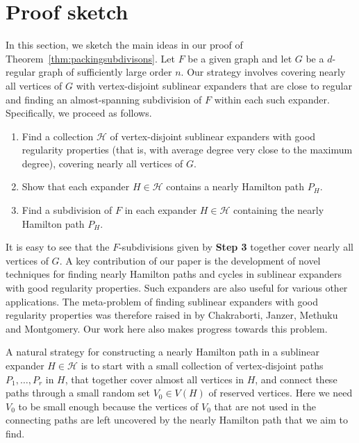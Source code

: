\documentclass[10pt]{article}
\theoremstyle{plain}
\numberwithin{theorem}{section}
\theoremstyle{definition}
\theoremstyle{remark}
\newcommand{\cH}{\mathcal{H}}
\theoremstyle{plain}
\begin{document}
\section{Proof sketch}
\label{sec:proofsketch}
In this section, we sketch the main ideas in our proof of Theorem~\ref{thm:packingsubdivisons}. Let $F$ be a given graph and let $G$ be a $d$-regular graph of sufficiently large order $n$.  
Our strategy involves covering nearly all vertices of
$G$ with vertex-disjoint sublinear expanders that are close to regular and finding an almost-spanning subdivision of
$F$ within each such expander. Specifically, we proceed as follows.
\begin{enumerate}
	\item[\textbf{Step 1.}] \label{packingexpanders} Find a collection $\mathcal{H}$ of vertex-disjoint sublinear expanders with good regularity properties (that is, with average degree very close to the maximum degree), covering nearly all vertices of $G$.

	 \item [\textbf{Step 2.}] Show that each expander $H \in \cH$ contains a nearly Hamilton path $P_H$.
	 \item [\textbf{Step 3.}]\label{almostspanningsubdivision} Find a subdivision of $F$ in each expander $H \in \cH$ containing the nearly Hamilton path $P_H$. 
\end{enumerate}

It is easy to see that the $F$-subdivisions given by \textbf{Step 3} together cover nearly all vertices of $G$. A key contribution of our paper is the development of novel techniques for finding nearly Hamilton paths and cycles in sublinear expanders with good regularity properties. Such expanders are also useful for various other applications. The meta-problem of finding sublinear expanders with good regularity properties was therefore raised in \cite{chakraborti2024edge} by Chakraborti, Janzer, Methuku and Montgomery. Our work here also makes progress towards this problem.

A natural strategy for constructing a nearly Hamilton path in a sublinear expander $H \in \cH$ is to start with a small collection of vertex-disjoint paths $P_1, \ldots, P_r$ in $H$, that together cover almost all vertices in $H$, and connect these paths through a small random set $V_0 \in V(H)$ of reserved vertices. Here we need $V_0$ to be small enough because the vertices of $V_0$ that are not used in the connecting paths are left uncovered by the nearly Hamilton path that we aim to find.
\end{document}
